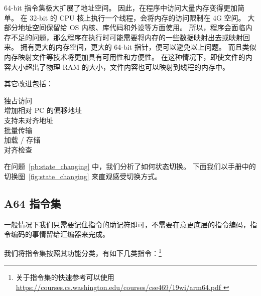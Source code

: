 64-bit 指令集极大扩展了地址空间。
因此，在程序中访问大量内存变得更加简单。
在 32-bit 的 CPU 核上执行一个线程，会将内存的访问限制在 4G 空间。
大部分地址空间保留给 OS 内核、库代码和外设等方面使用。
所以，程序会面临内存不足的问题，那么程序在执行时可能需要将内存的一些数据映射出去或映射回来。
拥有更大的内存空间，更大的 64-bit 指针，便可以避免以上问题。
而且类似内存映射文件等技术将更加具有可用性和方便性。
在这种情况下，即使文件的内容大小超出了物理 RAM 的大小，文件内容也可以映射到线程的内存中。

其它改进包括：
\begin{description}
  \item[独占访问]
  \item[增加相对 PC 的偏移地址]
  \item[支持未对齐地址]
  \item[批量传输]
  \item[加载 / 存储]
  \item[对齐检查]
\end{description}

在问题~\ref{pb:state_changing} 中，我们分析了如何状态切换。
下面我们以手册中的切换图~\ref{fig:state_changing} 来直观感受切换方式。


\subsection{A64 指令集}

一般情况下我们只需要记住指令的助记符即可，不需要在意更底层的指令编码，指令编码的事情留给汇编器来完成。

我们将指令集按照其功能分类，有如下几类指令：\footnote{
  关于指令集的快速参考可以使用 \url{
    https://courses.cs.washington.edu/courses/cse469/19wi/arm64.pdf
  }
}


